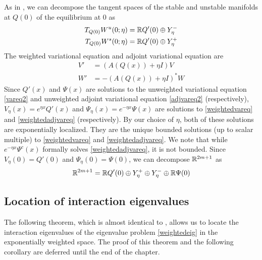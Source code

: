 \documentclass[thesis.tex]{subfiles}
\begin{document}
As in \cite{Sandstede1998}, we can decompose the tangent spaces of the stable and unstable manifolds at $Q(0)$ of the equilibrium at 0 as
\begin{equation}\label{Tetadecomp}
\begin{aligned}
T_{Q(0)}W^u(0; \eta) &= \mathbb{R} Q'(0) \oplus Y_\eta^- \\
T_{Q(0)}W^s(0; \eta) &= \mathbb{R} Q'(0) \oplus Y_\eta^+
\end{aligned}
\end{equation}
The weighted variational equation and adjoint variational equation are
\begin{align}
V' &= (A(Q(x)) + \eta I)V \label{weightedvareq} \\
W' &= -(A(Q(x)) + \eta I)^* W \label{weightedadjvareq}
\end{align}
Since $Q'(x)$ and $\Psi(x)$ are solutions to the unweighted variational equation \cref{vareq2} and unweighted adjoint variational equation \cref{adjvareq2} (respectively), $V_\eta(x) = e^{\eta x}Q'(x)$ and $\Psi_\eta(x) = e^{-\eta x}\Psi(x)$ are solutions to \cref{weightedvareq} and \cref{weightedadjvareq} (respectively). By our choice of $\eta$, both of these solutions are exponentially localized. They are the unique bounded solutions (up to scalar multiple) to \cref{weightedvareq} and \cref{weightedadjvareq}. We note that while $e^{-\eta x}\Psi^c(x)$ formally solves \cref{weightedadjvareq}, it is not bounded. Since $V_\eta(0) = Q'(0)$ and $\Psi_\eta(0) = \Psi(0)$, we can decompose $\mathbb{R}^{2m+1}$ as
\[
\mathbb{R}^{2m+1} = \mathbb{R} Q'(0) \oplus Y_\eta^+ \oplus Y_\eta^- \oplus \mathbb{R} \Psi(0)
\]

\subsection{Location of interaction eigenvalues}

The following theorem, which is almost identical to \cite[Theorem 2]{Sandstede1998}, allows us to locate the interaction eigenvalues of the eigenvalue problem \eqref{weightedeig} in the exponentially weighted space. The proof of this theorem and the following corollary are deferred until the end of the chapter.
\end{document}
